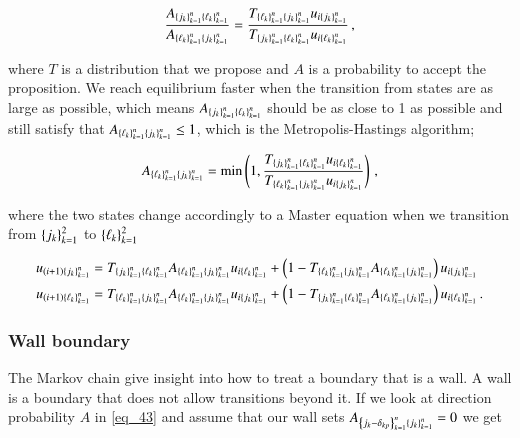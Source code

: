 \documentclass[11pt,english,a4paper]{article}
\begin{document}
\begin{flushleft}
\begin{align*}
\frac{A_{\left\lbrace{j_k}\right\rbrace_{k=1}^n \left\lbrace{\ell_k}\right\rbrace_{k=1}^n}}{A_{\left\lbrace{\ell_k}\right\rbrace_{k=1}^n \left\lbrace{j_k}\right\rbrace_{k=1}^n}} = \frac{T_{\left\lbrace{\ell_k}\right\rbrace_{k=1}^n \left\lbrace{j_k}\right\rbrace_{k=1}^n}u_{i\left\lbrace{j_k}\right\rbrace_{k=1}^n}}{T_{\left\lbrace{j_k}\right\rbrace_{k=1}^n \left\lbrace{\ell_k}\right\rbrace_{k=1}^n}u_{i\left\lbrace{\ell_k}\right\rbrace_{k=1}^n}} \,,
\end{align*}

where $T$ is a distribution that we propose and $A$ is a probability to accept the proposition. We reach equilibrium faster when the transition from states are as large as possible, which means $A_{\left\lbrace{j_k}\right\rbrace_{k=1}^n \left\lbrace{\ell_k}\right\rbrace_{k=1}^n}$ should be as close to 1 as possible and still satisfy that $A_{\left\lbrace{\ell_k}\right\rbrace_{k=1}^n \left\lbrace{j_k}\right\rbrace_{k=1}^n} \leq 1$, which is the Metropolis-Hastings algorithm;

\begin{align}
A_{\kr{\ell_k}_{k=1}^n\kr{j_k}_{k=1}^n} = \min\p{1,\frac{T_{\kr{j_k}_{k=1}^n\kr{\ell_k}_{k=1}^n}u_{i\kr{\ell_k}_{k=1}^n}}{T_{\kr{\ell_k}_{k=1}^n\kr{j_k}_{k=1}^n}u_{i\kr{j_k}_{k=1}^n}}}\,,
\label{eq_48}
\end{align}

where the two states change accordingly to a Master equation when we transition from $\left\lbrace{j_k}\right\rbrace_{k=1}^2$ to $\left\lbrace{\ell_k}\right\rbrace_{k=1}^2$ 

\begin{align}
u_{(i+1)\kr{j_k}_{k=1}^n} &=  T_{\kr{j_k}_{k=1}^n\kr{\ell_k}_{k=1}^n} A_{\kr{\ell_k}_{k=1}^n\kr{j_k}_{k=1}^n} u_{i\kr{\ell_k}_{k=1}^n} + \p{1-T_{\kr{\ell_k}_{k=1}^n\kr{j_k}_{k=1}^n} A_{\kr{\ell_k}_{k=1}^n\kr{j_k}_{k=1}^n}} u_{i\kr{j_k}_{k=1}^n}
\label{eq_49}\\
u_{(i+1)\kr{\ell_k}_{k=1}^n} &= T_{\kr{\ell_k}_{k=1}^n\kr{j_k}_{k=1}^n} A_{\kr{\ell_k}_{k=1}^n\kr{j_k}_{k=1}^n} u_{i\kr{j_k}_{k=1}^n} + \p{1-T_{\kr{j_k}_{k=1}^n\kr{\ell_k}_{k=1}^n} A_{\kr{\ell_k}_{k=1}^n\kr{j_k}_{k=1}^n}} u_{i\kr{\ell_k}_{k=1}^n} \,.
\label{eq_50}
\end{align} 

\subsubsection{Wall boundary}

The Markov chain give insight into how to treat a boundary that is a wall. A wall is a boundary that does not allow transitions beyond it. If we look at direction probability $A$ in \eqref{eq_43} and assume that our wall sets $A_{\left\lbrace{j_k-\delta_{kp}}\right\rbrace_{k=1}^n\left\lbrace{j_k}\right\rbrace_{k=1}^n}=0$ we get


\end{flushleft}
\end{document}
